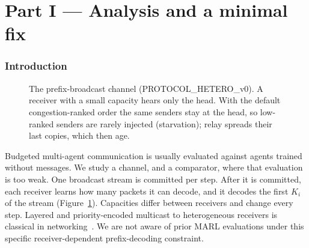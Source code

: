 \documentclass[11pt]{article}
\theoremstyle{definition}
\begin{document}
\part*{Part I --- Analysis and a minimal fix}

\section{Introduction}\label{sec:intro}
\begin{figure}[t]
\centering
{}
\caption{The prefix-broadcast channel (PROTOCOL\_HETERO\_v0). A receiver with a small capacity hears only the head.
With the default congestion-ranked order the same senders stay at the head, so low-ranked senders are rarely injected
(starvation); relay spreads their last copies, which then age.}
\label{fig:channel}
\end{figure}

Budgeted multi-agent communication is usually evaluated against agents trained without messages. We study a channel,
and a comparator, where that evaluation is too weak. One broadcast stream is committed per step. After it is committed,
each receiver learns how many packets it can decode, and it decodes the first $K_i$ of the stream
(Figure~\ref{fig:channel}). Capacities differ between receivers and change every step. Layered and priority-encoded
multicast to heterogeneous receivers is classical in networking~\cite{rlm,pet}. We are not aware of prior MARL
evaluations under this specific receiver-dependent prefix-decoding constraint.
\end{document}
